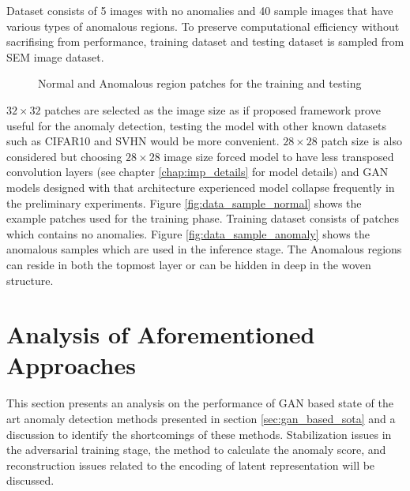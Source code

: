 Dataset consists of 5 images with no anomalies and 40 sample images that have various types of anomalous regions. To preserve 
computational efficiency without sacrifising from performance, training dataset and testing dataset is sampled from SEM image dataset.
\begin{figure}[h!]
	\hspace*{\fill}%
	\caption{Normal and Anomalous region patches for the training and testing}
	\label{fig:data_samples}
\end{figure}

$32 \times 32$ patches are selected as the image size as if proposed framework prove useful for the anomaly detection, 
testing the model with other known datasets such as CIFAR10 \cite{cifar10} and SVHN \cite{Netzer2011ReadingDI} would be more convenient. 
$28 \times 28$ patch size is also considered but choosing $28 \times 28$ image size forced model to have less transposed convolution 
layers (see chapter \ref{chap:imp_details} for model details) and GAN models designed with that architecture experienced model collapse 
frequently in the preliminary experiments.
Figure \ref{fig:data_sample_normal} shows the example patches used for the 
training phase. Training dataset consists of patches which contains no anomalies. Figure \ref{fig:data_sample_anomaly} 
shows the anomalous samples which are used in the inference stage. The Anomalous regions can reside in both the topmost layer
or can be hidden in deep in the woven structure.

\section{Analysis of Aforementioned Approaches}
\label{sec:analysis_before}

This section presents an analysis on the performance of GAN based state of the art anomaly detection methods 
presented in section \ref{sec:gan_based_sota} and a discussion to identify the shortcomings of these methods. 
Stabilization issues in the adversarial training stage, the method to calculate the anomaly score, and reconstruction 
issues related to the encoding of latent representation will be discussed.

